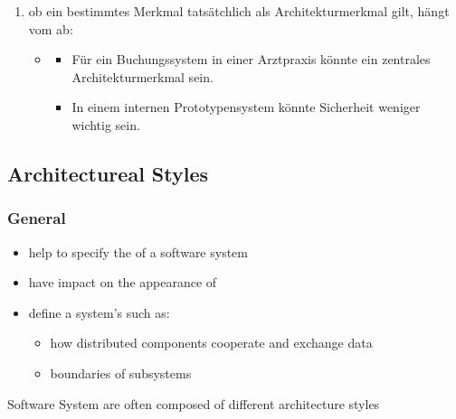 \begin{infoBox}
\begin{enumerate}
\begin{enumerate}
\begin{itemize}
                \begin{itemize}
                    \item Das System muss bestimmte funktionale und nicht-funktionale Anforderungen erfüllen. Ein Architekturmerkmal unterstützt die Umsetzung dieser Anforderungen.
                    \item Beispiel: Ein E-Commerce-System muss  sicherstellen, damit Nutzer jederzeit einkaufen können.
                \end{itemize}
            \end{itemize}
        \end{enumerate}
        \item {}
        ob ein bestimmtes Merkmal tatsätchlich als Architekturmerkmal gilt, hängt vom  ab:
        \begin{itemize}
            \item {}
            \begin{itemize}
                \item Für ein Buchungssystem in einer Arztpraxis könnte  ein zentrales Architekturmerkmal sein.
                \item In einem internen Prototypensystem könnte Sicherheit weniger wichtig sein.
            \end{itemize}
        \end{itemize}
    \end{enumerate}
\end{infoBox}
\subsection{Architectureal Styles}
\subsubsection*{General}
\begin{defBox}[title=Architectural styles ...]
    \begin{itemize}
        \item help to specify the  of a software system
        \item have impact on the appearance of 
        \item define a system's  such as:
        \begin{itemize}
            \item how distributed components cooperate and exchange data
            \item boundaries of subsystems
        \end{itemize}
    \end{itemize}
\end{defBox}
\begin{defBox}
    Software System are often composed of different architecture styles
\end{defBox}

